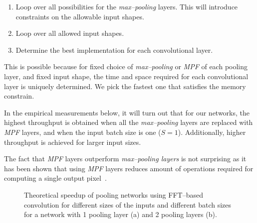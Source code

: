 \documentclass[conference]{./IEEEtran/IEEEtran}
\begin{document}
  \begin{enumerate}
    \item Loop over all possibilities for the \emph{max--pooling}
      layers.  This will introduce constraints on the allowable input
      shapes.
    \item Loop over all allowed input shapes.
    \item Determine the best implementation for each convolutional
      layer.
  \end{enumerate}

  This is possible because for fixed choice of \emph{max--pooling} or
  \emph{MPF} of each pooling layer, and fixed input shape, the time
  and space required for each convolutional layer is uniquely
  determined.  We pick the fastest one that satisfies the memory
  constrain.

  In the empirical measurements below, it will turn out that for our
  networks, the highest throughput is obtained when all
  the \emph{max--pooling} layers are replaced with \emph{MPF} layers,
  and when the input batch size is one ($S = 1$).  Additionally,
  higher throughput is achieved for larger input sizes.

  The fact that \emph{MPF} layers outperform \emph{max--pooling
    layers} is not surprising as it has been shown that
    using \emph{MPF} layers reduces amount of operations required for
    computing a single output
    pixel~\cite{giusti2013fast,masci2013fast}.

  \begin{figure}
    \centering
    \caption{Theoretical speedup of pooling networks using FFT--based
      convolution for different sizes of the inputs and different
      batch sizes for a network with 1 pooling layer (a) and 2 pooling
      layers (b).}
    \label{fig:fftbatch}
  \end{figure}
\end{document}
